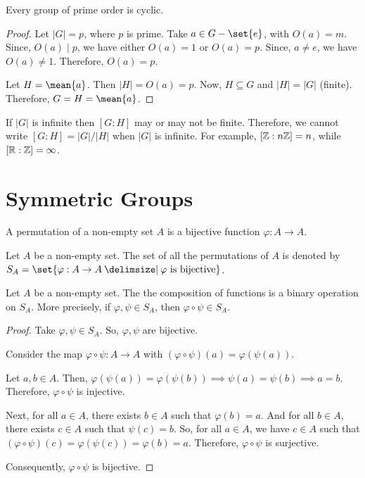 \documentclass[11pt]{penrose}
\newcommand{\cyclic}[1]{\mean{#1}}
\begin{document}
\begin{ncor}
    Every group of prime order is cyclic.
\end{ncor}
\begin{proof}
    Let $|G| = p$, where $p$ is prime. Take $a \in G-\set{e}$, with $O(a) = m$. Since, $O(a) \mid p$, we have either $O(a) = 1$ or $O(a) = p$. Since, $a \neq e$, we have $O(a) \neq 1$. Therefore, $O(a) = p$.

    Let $H = \cyclic{a}$. Then $|H| = O(a) = p$. Now, $H \subseteq G$ and $|H| = |G|$ (finite). Therefore, $G = H = \cyclic{a}$.
\end{proof}

\begin{remark}
    If $|G|$ is infinite then $[G:H]$ may or may not be finite. Therefore, we cannot write $[G:H] = |G|/|H|$ when $|G|$ is infinite. For example, $[\mathbb{Z}:n\mathbb{Z}]=n$, while $[\mathbb{R}:\mathbb{Z}] = \infty$.
\end{remark}

\section{Symmetric Groups}

\begin{ndfn}
    A permutation of a non-empty set $A$ is a bijective function $\varphi: A \to A$.
\end{ndfn}

\begin{notation}
    Let $A$ be a non-empty set. The set of all the permutations of $A$ is denoted by $S_A = \set{\varphi: A \to A \st \varphi \text{ is bijective}}$.
\end{notation}

\begin{nlemma}\label{lemma:composition-binary}
    Let $A$ be a non-empty set. The the composition of functions is a binary operation on $S_A$. More precisely, if $\varphi, \psi \in S_A$, then $\varphi \circ \psi \in S_A$.
\end{nlemma}
\begin{proof}
    Take $\varphi, \psi \in S_A$. So, $\varphi, \psi$ are bijective.

    Consider the map $\varphi \circ \psi : A \to A$ with $(\varphi \circ \psi)(a) = \varphi(\psi(a))$.

    Let $a, b \in A$. Then, $\varphi(\psi(a)) = \varphi(\psi(b)) \implies \psi(a) = \psi(b) \implies a = b$. Therefore, $\varphi \circ \psi$ is injective.

    Next, for all $a \in A$, there exists $b \in A$ such that $\varphi(b) = a$. And for all $b \in A$, there exists $c \in A$ such that $\psi(c) = b$. So, for all $a \in A$, we have $c \in A$ such that $(\varphi \circ \psi)(c) = \varphi(\psi(c)) = \varphi(b) = a$. Therefore, $\varphi \circ \psi$ is surjective.

    Consequently, $\varphi \circ \psi$ is bijective.
\end{proof}
\end{document}
